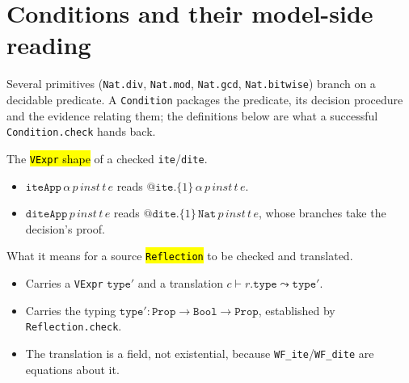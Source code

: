 \section{Conditions and their model-side reading}

Several primitives (\texttt{Nat.div}, \texttt{Nat.mod}, \texttt{Nat.gcd}, \texttt{Nat.bitwise})
branch on a decidable predicate. A \texttt{Condition} packages the predicate, its decision
procedure and the evidence relating them; the definitions below are what a successful
\texttt{Condition.check} hands back.

\begin{definition}
  \label{prim-cond:def:ite-dite-app}
  \leanok

   The \hl{\texttt{VExpr} shape} of a checked \texttt{ite}/\texttt{dite}.
  \begin{itemize}
  \item $\mathtt{iteApp}\,\alpha\,p\,\mathit{inst}\,t\,e$ reads $@\mathtt{ite}.\{1\}\,\alpha\,p\,\mathit{inst}\,t\,e$.
  \item $\mathtt{diteApp}\,p\,\mathit{inst}\,t\,e$ reads $@\mathtt{dite}.\{1\}\,\mathtt{Nat}\,p\,\mathit{inst}\,t\,e$, whose branches take the decision's proof.
  \end{itemize}
\end{definition}

\begin{definition}
  \label{prim-cond:struct:reflection-wf}
  \leanok

   What it means for a source \hl{\texttt{Reflection}} to be checked and translated.
  \begin{itemize}
  \item Carries a \texttt{VExpr} $\mathtt{type}'$ and a translation $c \vdash r.\mathtt{type}
    \leadsto \mathtt{type}'$.
  \item Carries the typing $\mathtt{type}' : \mathtt{Prop} \to \mathtt{Bool} \to \mathtt{Prop}$,
    established by \texttt{Reflection.check}.
  \item The translation is a field, not existential, because \texttt{WF\_ite}/\texttt{WF\_dite}
    are equations about it.
  \end{itemize}
\end{definition}

